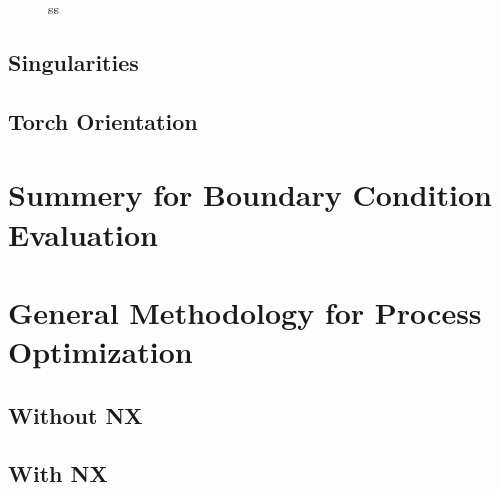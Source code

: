 \begin{figure}[H]%
	\centering
	\qquad
	\caption{ss }%
	\label{sss}%
\end{figure}


\subsection{Singularities }
\subsection{Torch Orientation}
\section{Summery for Boundary Condition Evaluation}
\section{General Methodology for Process Optimization}
\subsection{Without NX}
\subsection{With NX}